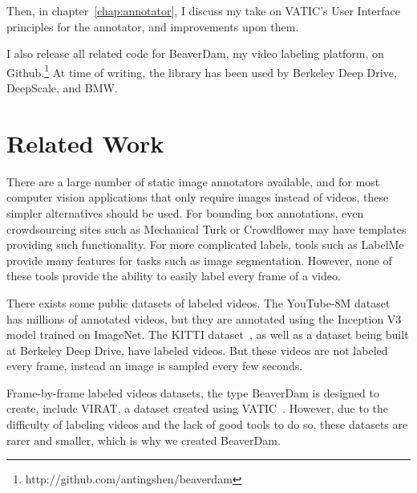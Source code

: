 Then, in chapter~\ref{chap:annotator}, I discuss my take on VATIC's User Interface principles for the annotator, and improvements upon them.

I also release all related code for BeaverDam, my video labeling platform, on Github.\footnote{http://github.com/antingshen/beaverdam} At time of writing, the library has been used by Berkeley Deep Drive, DeepScale, and BMW.

\section*{Related Work}
\label{sec:related}

There are a large number of static image annotators available, and for most computer vision applications that only require images instead of videos, these simpler alternatives should be used.
For bounding box annotations, even crowdsourcing sites such as Mechanical Turk or Crowdflower may have templates providing such functionality.
For more complicated labels, tools such as LabelMe~\cite{LabelMe} provide many features for tasks such as image segmentation.
However, none of these tools provide the ability to easily label every frame of a video.

There exists some public datasets of labeled videos.
The YouTube-8M dataset~\cite{YouTube-8M} has millions of annotated videos, but they are annotated using the Inception V3 model trained on ImageNet.
The KITTI dataset~\cite{KITTI}, as well as a dataset being built at Berkeley Deep Drive, have labeled videos.
But these videos are not labeled every frame, instead an image is sampled every few seconds.

Frame-by-frame labeled videos datasets, the type BeaverDam is designed to create, include VIRAT, a dataset created using VATIC~\cite{Vatic}.
However, due to the difficulty of labeling videos and the lack of good tools to do so, these datasets are rarer and smaller, which is why we created BeaverDam.

